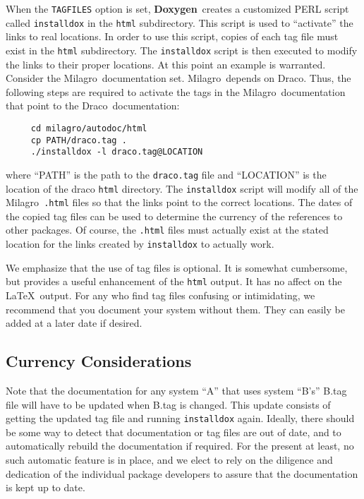 \documentclass[11pt]{nmemo}
\newcommand{\draco}{{\normalfont\sffamily Draco}}
\newcommand{\milagro}{{\normalfont\sffamily Milagro}}
\newcommand{\doxy}{{\normalfont\bfseries Doxygen}}
\begin{document}
When the \texttt{TAGFILES} option is set, \doxy\ creates a customized
PERL script called \texttt{installdox} in the \texttt{html}
subdirectory.  This script is used to ``activate'' the links to real
locations.  In order to use this script, copies of each tag file must
exist in the \texttt{html} subdirectory.  The \texttt{installdox}
script is then executed to modify the links to their proper locations.
At this point an example is warranted.  Consider the \milagro\ 
documentation set.  \milagro\ depends on \draco.  Thus, the following
steps are required to activate the tags in the \milagro\ documentation
that point to the \draco\ documentation:
\begin{verbatim}
     cd milagro/autodoc/html
     cp PATH/draco.tag .
     ./installdox -l draco.tag@LOCATION
\end{verbatim}
where ``PATH'' is the path to the \texttt{draco.tag} file 
and ``LOCATION'' is the
location of the draco \texttt{html} directory.
The \texttt{installdox} script will modify all of the \milagro\ \texttt{.html}
files so that the links point to the correct locations.    The dates of the
copied tag files
can be used to determine the currency of the references to other packages.
Of course, the \texttt{.html} files must actually exist at the stated location
for the links created by \texttt{installdox} to actually work.

We emphasize that the use of tag files is optional. It is somewhat cumbersome,
but provides a useful enhancement of the \texttt{html} output. It has no
affect on the \LaTeX\ output. For any who find tag files confusing or
intimidating, we recommend that you document your system without them. They
can easily be added at a later date if desired.


\subsection{Currency Considerations}
Note that the documentation for 
any system ``A'' that uses system ``B's'' B.tag file will have to be
updated when B.tag is changed. This update consists of getting the updated
tag file and running \texttt{installdox} again. 
Ideally, there should be some way to detect that documentation
or tag files are out of date, and to automatically rebuild the
documentation if required.  For the present at least, no such automatic
feature is in place, and we elect to rely
on the diligence and dedication of the individual package developers to 
assure that the documentation is kept up to date. 
\end{document}

